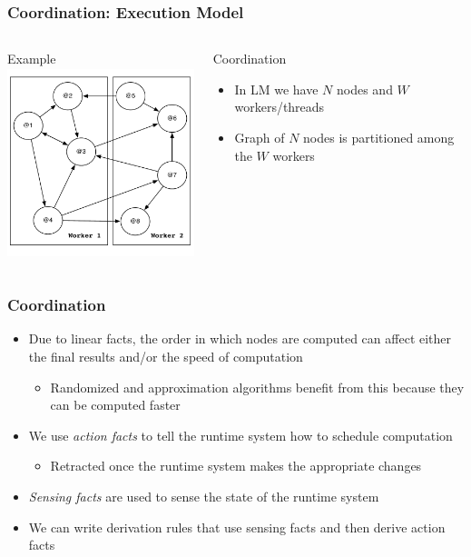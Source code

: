 \documentclass{beamer}
\begin{document}
\begin{frame}[fragile]
   \frametitle{Coordination: Execution Model}
   \begin{columns}[t]
          \begin{block}{Example}
             \includegraphics[height=5.5cm]{graph_coordination.pdf}
          \end{block}
          \begin{block}{Coordination}
             {\small
             \begin{itemize}
                \item In LM we have $N$ nodes and $W$ workers/threads
                \item Graph of $N$ nodes is partitioned among the $W$ workers
             \end{itemize}
             }
          \end{block}
   \end{columns}
\end{frame}

\begin{frame}[fragile]
   \frametitle{Coordination}
   \begin{itemize}
      \item Due to linear facts, the order in which nodes are computed can affect either the final results and/or the speed of computation
      \begin{itemize}
         \item Randomized and approximation algorithms benefit from this because they can be computed faster
      \end{itemize}
      \item We use \emph{action facts} to tell the runtime system how to schedule computation
      \begin{itemize}
         \item Retracted once the runtime system makes the appropriate changes
      \end{itemize}
      \item \emph{Sensing facts} are used to sense the state of the runtime system
      \item We can write derivation rules that use sensing facts and then derive action facts
   \end{itemize}
\end{frame}
\end{document}

